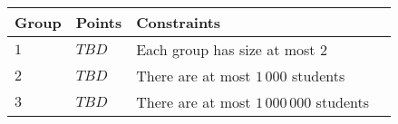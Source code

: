 \noindent
\begin{tabular}{| l | l | l | l |}
\hline
Group & Points & Constraints \\ \hline
$1$    & $TBD$         & Each group has size at most $2$ \\ \hline
$2$    & $TBD$         & There are at most $1\,000$ students\\ \hline
$3$    & $TBD$         & There are at most $1\,000\,000$ students \\ \hline
\end{tabular}
